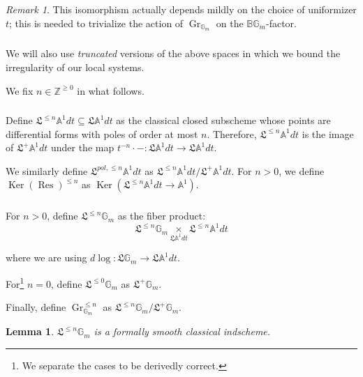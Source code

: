 \documentclass[reqno,11pt]{amsart}
\numberwithin{equation}{subsection}
\newtheorem{lem}[thm]{Lemma}
\theoremstyle{remark}
\newtheorem{rem}[thm]{Remark}
\newcommand{\bA}{{\mathbb A}}
\newcommand{\bB}{{\mathbb B}}
\newcommand{\bG}{{\mathbb G}}
\newcommand{\bZ}{{\mathbb Z}}
\newcommand{\fL}{{\mathfrak L}}
\newcommand{\on}{\operatorname}
\newcommand{\Ker}{\on{Ker}}
\newcommand{\Res}{\on{Res}}
\newcommand{\Gr}{\on{Gr}}
\renewcommand{\subset}{\subseteq}
\begin{document}
\begin{rem}

This isomorphism actually depends mildly on the choice of uniformizer $t$;
this is needed to trivialize the action of 
$\Gr_{\bG_m}$ on the $\bB \bG_m$-factor. 

\end{rem}

\subsubsection{}

We will also use \emph{truncated} versions of the above spaces in 
which we bound the irregularity of our local systems.

We fix $n \in \bZ^{\geq 0}$ in what follows.

\subsubsection{}

Define $\fL^{\leq n} \bA^1 dt \subset \fL \bA^1 dt$ as the
classical closed subscheme whose points are differential 
forms with poles of order at most $n$. Therefore, 
$\fL^{\leq n} \bA^1 dt$ is the image of $\fL^+ \bA^1 dt$ under the
map $t^{-n} \cdot -:\fL \bA^1 dt \to \fL \bA^1 dt$.

We similarly define $\fL^{pol,\leq n} \bA^1 dt$ as 
$\fL^{\leq n} \bA^1 dt/\fL^+ \bA^1 dt$. For $n > 0$, we define
$\Ker(\Res)^{\leq n}$ as $\Ker(\fL^{\leq n} \bA^1 dt \to \bA^1)$.

\subsubsection{}\label{ss:loop-gr-trun}

For $n>0$, define $\fL^{\leq n} \bG_m$ as the fiber product:
%
\[
\fL^{\leq n} \bG_m \underset{\fL \bA^1 dt}{\times} \fL^{\leq n} \bA^1 dt
\]

\noindent where we are using $d\log:\fL \bG_m \to \fL \bA^1 dt$.

For\footnote{We separate the cases to be derivedly correct.} 
$n = 0$, define $\fL^{\leq 0} \bG_m$ as $\fL^+ \bG_m$.

Finally, define $\Gr_{\bG_m}^{\leq n}$ as $\fL^{\leq n}\bG_m/\fL^+\bG_m$.

\begin{lem}

$\fL^{\leq n} \bG_m$ is a formally smooth classical indscheme.

\end{lem}
\end{document}
